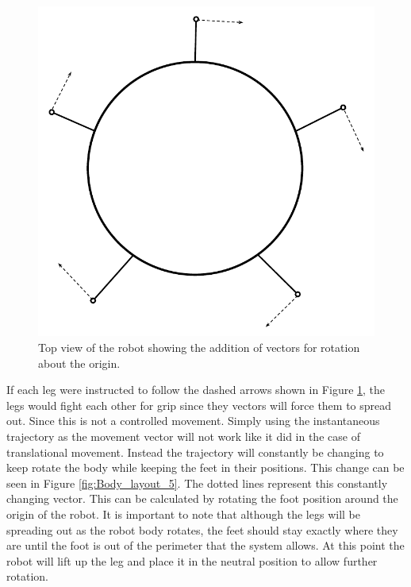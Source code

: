 \FloatBarrier
\begin{figure}[h]
\centering
\includegraphics[scale = 1]{pics/Body_Layout_4.pdf}
\caption{Top view of the robot showing the addition of vectors for rotation about the origin.}
\label{fig:Body_layout_4}
\end{figure}
\FloatBarrier

If each leg were instructed to follow the dashed arrows shown in Figure \ref{fig:Body_layout_4}, the legs would fight each other for grip since they vectors will force them to spread out. Since this is not a controlled movement. Simply using the instantaneous trajectory as the movement vector will not work like it did in the case of translational movement. Instead the trajectory will constantly be changing to keep rotate the body while keeping the feet in their positions. This change can be seen in Figure \ref{fig:Body_layout_5}. The dotted lines represent this constantly changing vector. This can be calculated by rotating the foot position around the origin of the robot. It is important to note that although the legs will be spreading out as the robot body rotates, the feet should stay exactly where they are until the foot is out of the perimeter that the system allows. At this point the robot will lift up the leg and place it in the neutral position to allow further rotation.

